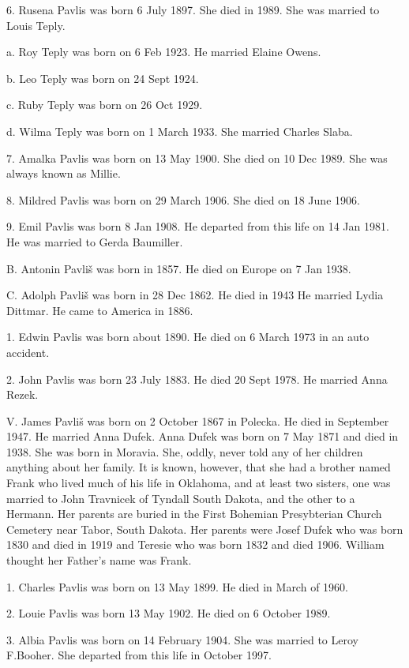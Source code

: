 \documentclass[a4paper]{article}
\begin{document}
6. Rusena Pavlis was born 6 July 1897.  She died in 1989.  She was married to Louis Teply.

a. Roy Teply was born on 6 Feb 1923.  He married Elaine Owens.

b. Leo Teply was born on 24 Sept 1924.  

c. Ruby Teply was born on 26 Oct 1929.

d. Wilma Teply was born on 1 March 1933.  She married Charles Slaba.

7. Amalka Pavlis was born on 13 May 1900.  She died on 10 Dec 1989.  She was always known as Millie.

8. Mildred Pavlis was born on 29 March 1906.  She died on 18 June 1906.

9. Emil Pavlis was born 8 Jan 1908.  He departed from this life on 14 Jan 1981. He was married to Gerda Baumiller.

B. Antonin Pavli\v{s} was born in 1857.  He died on Europe on 7 Jan 1938. 

C. Adolph Pavli\v{s} was born in 28 Dec 1862.  He died in 1943  He married Lydia Dittmar. He came to America in 1886.  

1. Edwin Pavlis was born about 1890.  He died on 6 March 1973 in an auto accident. 

2. John Pavlis was born 23 July 1883.  He died 20 Sept 1978. He married Anna Rezek.

V.  James Pavli\v{s} was born on 2 October 1867 in Polecka.  He died in September 1947.  He married Anna  Dufek.  Anna Dufek was born on 7 May 1871 and died in 1938.  She was born in Moravia.  She, oddly, never told any of her children anything about her family.  It is known, however, that she had a brother named Frank who lived much of his life in Oklahoma, and at least two  sisters, one was married to John Travnicek of Tyndall South Dakota, and the other to a Hermann.  Her parents are buried in the First Bohemian Presybterian Church Cemetery near Tabor, South Dakota.  Her parents were Josef Dufek who was born 1830 and died in 1919 and Teresie who was born 1832 and died 1906.   William thought her Father's name was Frank.  

1. Charles Pavlis was born on 13 May 1899.  He died in March of 1960.  

2. Louie Pavlis was born 13 May 1902.  He died on 6 October 1989.

3. Albia Pavlis was born on 14 February 1904.  She was married to Leroy F.Booher. She departed from this life in October 1997.
\end{document}
